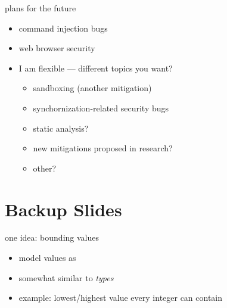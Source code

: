 
\begin{frame}{plans for the future}
    \begin{itemize}
        \item command injection bugs
        \item web browser security
        \item I am flexible --- different topics you want?
            \begin{itemize}
            \item sandboxing (another mitigation)
            \item synchornization-related security bugs
            \item static analysis?
            \item new mitigations proposed in research?
            \item other?
            \end{itemize}
    \end{itemize}
\end{frame}


\section{Backup Slides}

\begin{frame}{one idea: bounding values}
    \begin{itemize}
    \item model values as 
    \item somewhat similar to \textit{types}
    \item example: lowest/highest value every integer can contain
    \end{itemize}
\end{frame}

